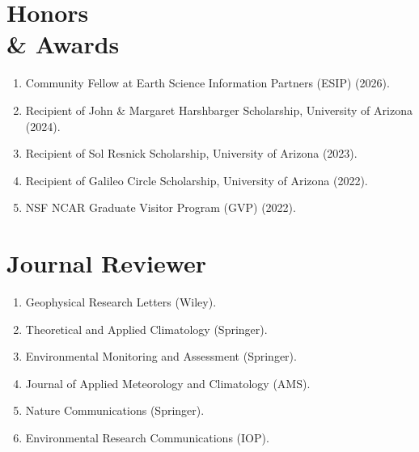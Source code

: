 \documentclass[margin,line]{resume}
\begin{document}
\begin{resume}
		\section{\mysidestyle \textbf{\textcolor{sep}{Honors \\\& Awards}}}
		\begin{enumerate}[topsep=0.1pt, partopsep=1pt, itemsep=0.1pt, parsep=0.1pt, leftmargin=12pt,label=\roman{*})]
			\item Community Fellow at Earth Science Information Partners (ESIP) (2026).
			\item Recipient of John \& Margaret Harshbarger Scholarship, University of Arizona (2024).
			\item Recipient of Sol Resnick Scholarship, University of Arizona (2023).
			\item Recipient of Galileo Circle Scholarship, University of Arizona (2022).
			\item NSF NCAR Graduate Visitor Program (GVP) (2022).
			
		\end{enumerate} 
		\vspace*{-3mm}
	
		\section{\mysidestyle \textbf{\textcolor{sep}{Journal Reviewer}}}
		\begin{enumerate}[topsep=0.1pt, partopsep=1pt, itemsep=0.1pt, parsep=0.1pt, leftmargin=12pt,label=\roman{*})]
			\item Geophysical Research Letters (Wiley).
			\item Theoretical and Applied Climatology (Springer).
			\item Environmental Monitoring and Assessment (Springer).
			\item Journal of Applied Meteorology and Climatology (AMS).
			\item Nature Communications (Springer).
			\item Environmental Research Communications (IOP).
	
			
		\end{enumerate} 
		
	
		
	\end{resume}
\end{document}
